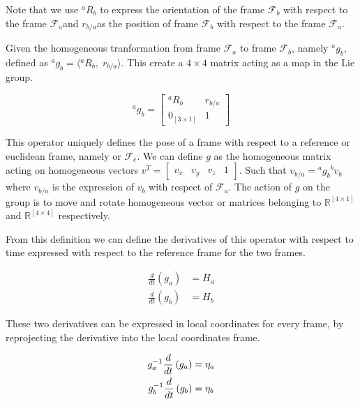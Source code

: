 \documentclass[12pt,a4paper]{book}
\newcommand{\Fa}{\ensuremath{\mathcal{F}_a}}
\newcommand{\Fb}{\ensuremath{\mathcal{F}_b}}
\newcommand{\Fe}{\ensuremath{\mathcal{F}_e}}
\newcommand{\agb}{\ensuremath{{^a g _b}}}
\newcommand{\aRb}{\ensuremath{{^a R _b}}}
\newcommand{\rba}{\ensuremath{{r_{b/a}}}}
\begin{document}
Note that we use \aRb{} to express the orientation of the frame \Fb{} with respect to the frame \Fa and \rba as the position of frame \Fb{} with respect to the frame \Fa{}.

Given the homogeneous tranformation from frame \Fa{} to frame \Fb{}, namely \agb{}, defined as $\agb = \langle \aRb,\; \rba \rangle$. This create a $4 \times 4$ matrix acting as a map in the Lie group.



\begin{equation}
	\agb = 
	\begin{bmatrix}
		\aRb			&	\rba	\\
		0_{[3\times1]}	&	1
	\end{bmatrix}
\end{equation}

This operator uniquely defines the pose of a frame with respect to a reference or euclidean frame, namely \Fw{} or \Fe{}.
We can define $g$ as the homogeneous matrix acting on homogeneous vectors $v^T = \begin{bmatrix}v_x	&	v_y	&	v_z	&	1\end{bmatrix}$. Such that $v_{b/a} = {^ag_b} {^b v_b}$ where $v_{b/a}$ is the expression of $v_b$ with respect of \Fa{}. The action of $g$ on the group is to move and rotate homogeneous vector or matrices belonging to $\mathbb{R}^{[4 \times 1]}$ and $\mathbb{R}^{[4 \times 4]}$ respectively.




From this definition we can define the derivatives of this operator with respect to time expressed with respect to the reference frame for the two frames.

\begin{equation}
\begin{aligned}
	\frac{d}{dt}\left( g_a \right) &= H_{a} \\
	\frac{d}{dt}\left( g_b \right) &= H_{b}
\end{aligned}
\end{equation}

These two derivatives can be expressed in local coordinates for every frame, by reprojecting the derivative into the local coordinates frame.

\begin{equation}
\begin{aligned}
	g_a ^{-1} \frac{d}{dt}\left( g_a \right) &= \eta_{a} \\
	g_b ^{-1} \frac{d}{dt}\left( g_b \right) &= \eta_{b}
\end{aligned}
\end{equation}
\end{document}
